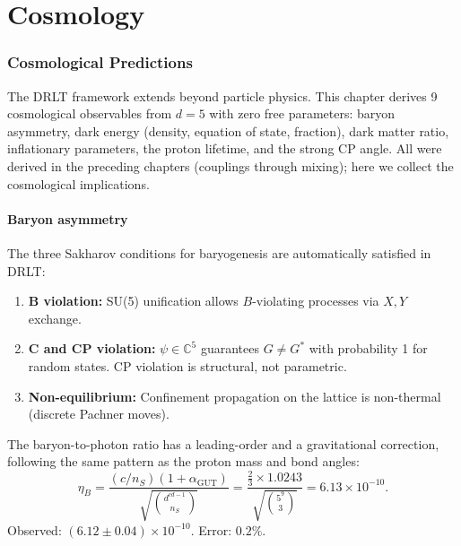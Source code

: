 \documentclass[12pt]{article}
\theoremstyle{remark}
\theoremstyle{definition}
\newcommand{\CC}{\mathbb{C}}
\begin{document}
\part{Cosmology}

\section{Cosmological Predictions}
\label{ch:cosmology}

The DRLT framework extends beyond particle physics. This chapter derives 9 cosmological observables from $d = 5$ with zero free parameters: baryon asymmetry, dark energy (density, equation of state, fraction), dark matter ratio, inflationary parameters, the proton lifetime, and the strong CP angle. All were derived in the preceding chapters (couplings through mixing); here we collect the cosmological implications.

\subsection{Baryon asymmetry}

The three Sakharov conditions for baryogenesis are automatically satisfied in DRLT:
\begin{enumerate}
\item \textbf{B violation:} SU(5) unification allows $B$-violating processes via $X, Y$ exchange.
\item \textbf{C and CP violation:} $\psi \in \CC^5$ guarantees $G \neq G^*$ with probability 1 for random states. CP violation is structural, not parametric.
\item \textbf{Non-equilibrium:} Confinement propagation on the lattice is non-thermal (discrete Pachner moves).
\end{enumerate}

The baryon-to-photon ratio has a leading-order and a gravitational correction, following the same pattern as the proton mass and bond angles:
\begin{equation}
\eta_B = \frac{(c/n_S)(1 + \alpha_\text{GUT})}{\sqrt{\binom{d^{cd-1}}{n_S}}} = \frac{\frac{2}{3} \times 1.0243}{\sqrt{\binom{5^9}{3}}} = 6.13 \times 10^{-10}.
\end{equation}
Observed: $(6.12 \pm 0.04) \times 10^{-10}$. Error: $0.2\%$.
\end{document}
